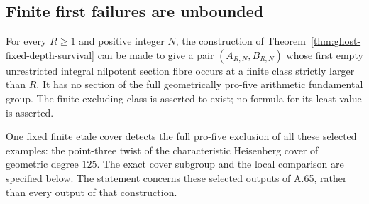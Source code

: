 \subsection{Finite first failures are unbounded}

\begin{theorem}
\label{thm:ghost-unbounded-finite-failures}
For every \(R\ge1\) and positive integer \(N\),
the construction of Theorem~\ref{thm:ghost-fixed-depth-survival}
can be made to give a pair \((A_{R,N},B_{R,N})\)
whose first empty unrestricted integral nilpotent
section fibre occurs at a finite class strictly
larger than \(R\). It has no section of the full
geometrically pro-five arithmetic fundamental group.
The finite excluding class is asserted to exist;
no formula for its least value is asserted.

One fixed finite etale cover detects the full
pro-five exclusion of all these selected examples:
the point-three twist of the characteristic
Heisenberg cover of geometric degree \(125\).
The exact cover subgroup and the local comparison
are specified below. The statement concerns these
selected outputs of A.65, rather than every output
of that construction.
\end{theorem}
